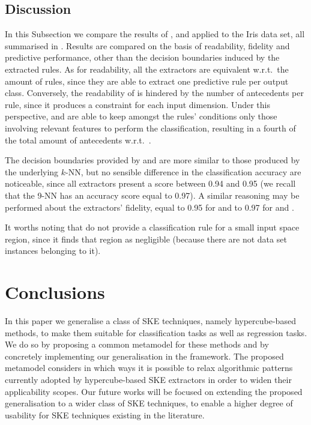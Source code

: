 \documentclass[
]{ceurart}
\begin{document}
\subsection{Discussion}



In this Subsection we compare the results of \cart{}, \iter{} and \gridex{} applied to the Iris data set, all summarised in .
%
Results are compared on the basis of readability, fidelity and predictive performance, other than the decision boundaries induced by the extracted rules.
%
As for readability, all the extractors are equivalent w.r.t.\ the amount of rules, since they are able to extract one predictive rule per output class.
%
Conversely, the readability of \iter{} is hindered by the number of antecedents per rule, since it produces a constraint for each input dimension.
%
Under this perspective, \cart{} and \gridex{} are able to keep amongst the rules' conditions only those involving relevant features to perform the classification, resulting in a fourth of the total amount of antecedents w.r.t.\ \iter{}.

The decision boundaries provided by \gridex{} and \iter{} are more similar to those produced by the underlying $k$-NN, but no sensible difference in the classification accuracy are noticeable, since all extractors present a score between 0.94 and 0.95 (we recall that the 9-NN has an accuracy score equal to 0.97).
%
A similar reasoning may be performed about the extractors' fidelity, equal to 0.95 for \cart{} and to 0.97 for \iter{} and \gridex{}.

It worths noting that \gridex{} do not provide a classification rule for a small input space region, since it finds that region as negligible (because there are not data set instances belonging to it).

\section{Conclusions}\label{sec:conclusions}

In this paper we generalise a class of SKE techniques, namely hypercube-based methods, to make them suitable for classification tasks as well as regression tasks.
%
We do so by proposing a common metamodel for these methods and by concretely implementing our generalisation in the \psyke{} framework.
%
The proposed metamodel considers in which ways it is possible to relax algorithmic patterns currently adopted by hypercube-based SKE extractors in order to widen their applicability scopes.
%
Our future works will be focused on extending the proposed generalisation to a wider class of SKE techniques, to enable a higher degree of usability for SKE techniques existing in the literature.
\end{document}
